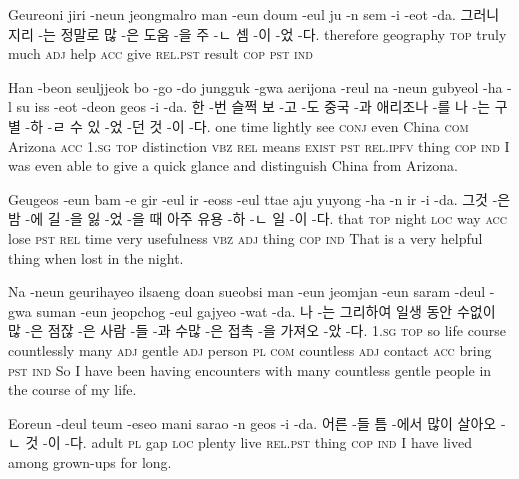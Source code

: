 \begin{example}
\tgl
		{Geureoni jiri -neun jeongmalro man -eun doum -eul ju -n sem -i -eot -da.}
		{그러니 지리 -는 정말로 많 -은 도움 -을 주 -ㄴ 셈 -이 -었 -다.}
		{therefore	geography	\textsc{top}	truly	much	\textsc{adj}	help	\textsc{acc}	give	\textsc{rel.pst}	result	\textsc{cop}	\textsc{pst}	\textsc{ind}}
		{}
\end{example}

\begin{example}
\tgl
		{Han -beon seuljjeok bo -go -do jungguk -gwa aerijona -reul na -neun gubyeol -ha -l su iss -eot -deon geos -i -da.}
		{한 -번 슬쩍 보 -고 -도 중국 -과 애리조나 -를 나 -는 구별 -하 -ㄹ 수 있 -었 -던 것 -이 -다.}
		{one	time	lightly	see	\textsc{conj}	even	China	\textsc{com}	Arizona	\textsc{acc}	\textsc{1.sg}	\textsc{top}	distinction	\textsc{vbz}	\textsc{rel}	means	\textsc{exist}	\textsc{pst}	\textsc{rel.ipfv}	thing	\textsc{cop}	\textsc{ind}}
		{I was even able to give a quick glance and distinguish China from Arizona.}
\end{example}

\begin{example}
\tgl
		{Geugeos -eun bam -e gir -eul ir -eoss -eul ttae aju yuyong -ha -n ir -i -da.}
		{그것 -은 밤 -에 길 -을 잃 -었 -을 때 아주 유용 -하 -ㄴ 일 -이 -다.}
		{that	\textsc{top}	night	\textsc{loc}	way	\textsc{acc}	lose	\textsc{pst}	\textsc{rel}	time	very	usefulness	\textsc{vbz}	\textsc{adj}	thing	\textsc{cop}	\textsc{ind}}
		{That is a very helpful thing when lost in the night.}
\end{example}

\begin{example}
\tgl
		{Na -neun geurihayeo ilsaeng doan sueobsi man -eun jeomjan -eun saram -deul -gwa suman -eun jeopchog -eul gajyeo -wat -da.}
		{나 -는 그리하여 일생 동안 수없이 많 -은 점잖 -은 사람 -들 -과 수많 -은 접촉 -을 가져오 -았 -다.}
		{\textsc{1.sg}	\textsc{top}	so	life	course	countlessly	many	\textsc{adj}	gentle	\textsc{adj}	person	\textsc{pl}	\textsc{com}	countless	\textsc{adj}	contact	\textsc{acc}	bring	\textsc{pst}	\textsc{ind}}
		{So I have been having encounters with many countless gentle people in the course of my life.}
\end{example}

\begin{example}
\tgl
		{Eoreun -deul teum -eseo mani sarao -n geos -i -da.}
		{어른 -들 틈 -에서 많이 살아오 -ㄴ 것 -이 -다.}
		{adult	\textsc{pl}	gap	\textsc{loc}	plenty	live	\textsc{rel.pst}	thing	\textsc{cop}	\textsc{ind}}
		{I have lived among grown-ups for long.}
\end{example}


